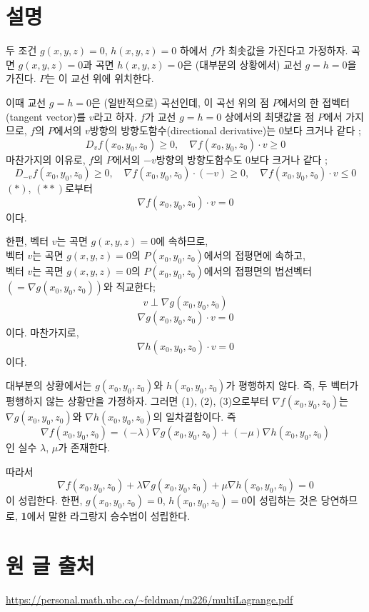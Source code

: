 \documentclass{article}
\begin{document}
\newpage
\section{설명}
두 조건 $g(x,y,z)=0$, $h(x,y,z)=0$ 하에서 $f$가 최솟값을 가진다고 가정하자.
곡면 $g(x,y,z)=0$과 곡면 $h(x,y,z)=0$은 (대부분의 상황에서) 교선 $g=h=0$을 가진다.
$P$는 이 교선 위에 위치한다.

이때 교선 $g=h=0$은 (일반적으로) 곡선인데, 이 곡선 위의 점 $P$에서의 한 접벡터(tangent vector)를 $v$라고 하자.
$f$가 교선 $g=h=0$ 상에서의 최댓값을 점 $P$에서 가지므로, $f$의 $P$에서의 $v$방향의 방향도함수(directional derivative)는 0보다 크거나 같다 ; 
\[
D_vf(x_0,y_0,z_0)\ge0,\quad \nabla f(x_0,y_0,z_0)\cdot v\ge0\tag{$*$}
\]
마찬가지의 이유로, $f$의 $P$에서의 $-v$방향의 방향도함수도 0보다 크거나 같다 ; 
\[
D_{-v}f(x_0,y_0,z_0)\ge0,\quad\nabla f(x_0,y_0,z_0)\cdot(-v)\ge0,\quad
\nabla f(x_0,y_0,z_0)\cdot v\le0\tag{$**$}
\]
$(*)$, $(**)$로부터
\[
\nabla f(x_0,y_0,z_0)\cdot v=0\tag{$1$}
\]
이다.

한편, 벡터 $v$는 곡면 $g(x,y,z)=0$에 속하므로,\\
벡터 $v$는 곡면 $g(x,y,z)=0$의 $P(x_0,y_0,z_0)$에서의 접평면에 속하고,\\
벡터 $v$는 곡면 $g(x,y,z)=0$의 $P(x_0,y_0,z_0)$에서의 접평면의 법선벡터$\left(=\nabla g(x_0,y_0,z_0)\right)$와 직교한다;
$$v\perp \nabla g(x_0,y_0,z_0)$$
\[\nabla g(x_0,y_0,z_0)\cdot v = 0\tag{2}\]
이다.
마찬가지로,
\[\nabla h(x_0,y_0,z_0)\cdot v = 0\tag{3}\]
이다.

대부분의 상황에서는 $g(x_0,y_0,z_0)$와 $h(x_0,y_0,z_0)$가 평행하지 않다.
즉, 두 벡터가 평행하지 않는 상황만을 가정하자.
그러면 (1), (2), (3)으로부터 $\nabla f(x_0,y_0,z_0)$는 $\nabla g(x_0,y_0,z_0)$와 $\nabla h(x_0,y_0,z_0)$의 일차결합이다.
즉
$$\nabla f(x_0,y_0,z_0)=(-\lambda)\nabla g(x_0,y_0,z_0)+(-\mu)\nabla h(x_0,y_0,z_0)$$
인 실수 $\lambda$, $\mu$가 존재한다.

따라서
$$\nabla f(x_0,y_0,z_0)+\lambda\nabla g(x_0,y_0,z_0)+\mu\nabla h(x_0,y_0,z_0)=0$$
이 성립한다.
한편, $g(x_0,y_0,z_0)=0$, $h(x_0,y_0,z_0)=0$이 성립하는 것은 당연하므로, \textbf{1}에서 말한 라그랑지 승수법이 성립한다.


\section*{원 글 출처}
\url{https://personal.math.ubc.ca/~feldman/m226/multiLagrange.pdf}
\end{document}

